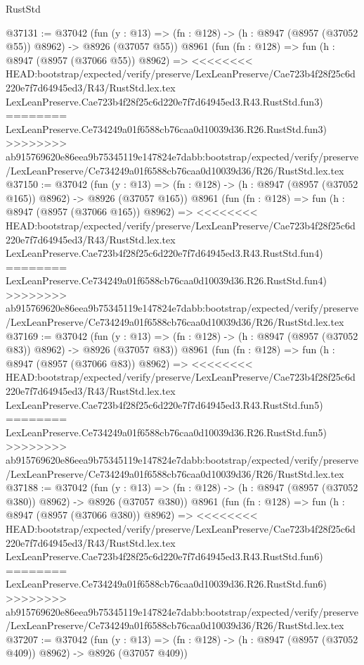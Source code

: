 \begin{lexlean}{RustStd}
\begin{coremodule}
{\begin{coremodule}
{{{{{{{{{{{{{{{{{{{{{{{{{{{{{{{{{{{{{{{@37131 := @37042
    (fun (y : @13) => (fn : @128) -> (h : @8947 (@8957 (@37052 @55)) @8962) -> @8926 (@37057 @55))
    @8961
    (fun (fn : @128) =>
    fun (h : @8947 (@8957 (@37066 @55)) @8962) =>
<<<<<<<< HEAD:bootstrap/expected/verify/preserve/LexLeanPreserve/Cae723b4f28f25c6d220e7f7d64945ed3/R43/RustStd.lex.tex
    LexLeanPreserve.Cae723b4f28f25c6d220e7f7d64945ed3.R43.RustStd.fun3)
========
    LexLeanPreserve.Ce734249a01f6588cb76caa0d10039d36.R26.RustStd.fun3)
>>>>>>>> ab915769620e86eea9b75345119e147824e7dabb:bootstrap/expected/verify/preserve/LexLeanPreserve/Ce734249a01f6588cb76caa0d10039d36/R26/RustStd.lex.tex
@37150 := @37042
    (fun (y : @13) => (fn : @128) -> (h : @8947 (@8957 (@37052 @165)) @8962) -> @8926 (@37057 @165))
    @8961
    (fun (fn : @128) =>
    fun (h : @8947 (@8957 (@37066 @165)) @8962) =>
<<<<<<<< HEAD:bootstrap/expected/verify/preserve/LexLeanPreserve/Cae723b4f28f25c6d220e7f7d64945ed3/R43/RustStd.lex.tex
    LexLeanPreserve.Cae723b4f28f25c6d220e7f7d64945ed3.R43.RustStd.fun4)
========
    LexLeanPreserve.Ce734249a01f6588cb76caa0d10039d36.R26.RustStd.fun4)
>>>>>>>> ab915769620e86eea9b75345119e147824e7dabb:bootstrap/expected/verify/preserve/LexLeanPreserve/Ce734249a01f6588cb76caa0d10039d36/R26/RustStd.lex.tex
@37169 := @37042
    (fun (y : @13) => (fn : @128) -> (h : @8947 (@8957 (@37052 @83)) @8962) -> @8926 (@37057 @83))
    @8961
    (fun (fn : @128) =>
    fun (h : @8947 (@8957 (@37066 @83)) @8962) =>
<<<<<<<< HEAD:bootstrap/expected/verify/preserve/LexLeanPreserve/Cae723b4f28f25c6d220e7f7d64945ed3/R43/RustStd.lex.tex
    LexLeanPreserve.Cae723b4f28f25c6d220e7f7d64945ed3.R43.RustStd.fun5)
========
    LexLeanPreserve.Ce734249a01f6588cb76caa0d10039d36.R26.RustStd.fun5)
>>>>>>>> ab915769620e86eea9b75345119e147824e7dabb:bootstrap/expected/verify/preserve/LexLeanPreserve/Ce734249a01f6588cb76caa0d10039d36/R26/RustStd.lex.tex
@37188 := @37042
    (fun (y : @13) => (fn : @128) -> (h : @8947 (@8957 (@37052 @380)) @8962) -> @8926 (@37057 @380))
    @8961
    (fun (fn : @128) =>
    fun (h : @8947 (@8957 (@37066 @380)) @8962) =>
<<<<<<<< HEAD:bootstrap/expected/verify/preserve/LexLeanPreserve/Cae723b4f28f25c6d220e7f7d64945ed3/R43/RustStd.lex.tex
    LexLeanPreserve.Cae723b4f28f25c6d220e7f7d64945ed3.R43.RustStd.fun6)
========
    LexLeanPreserve.Ce734249a01f6588cb76caa0d10039d36.R26.RustStd.fun6)
>>>>>>>> ab915769620e86eea9b75345119e147824e7dabb:bootstrap/expected/verify/preserve/LexLeanPreserve/Ce734249a01f6588cb76caa0d10039d36/R26/RustStd.lex.tex
@37207 := @37042
    (fun (y : @13) => (fn : @128) -> (h : @8947 (@8957 (@37052 @409)) @8962) -> @8926 (@37057 @409))
}}}}}}}}}}}}}}}}}}}}}}}}}}}}}}}}}}}}}}}
\end{coremodule}}
\end{coremodule}
\end{lexlean}
